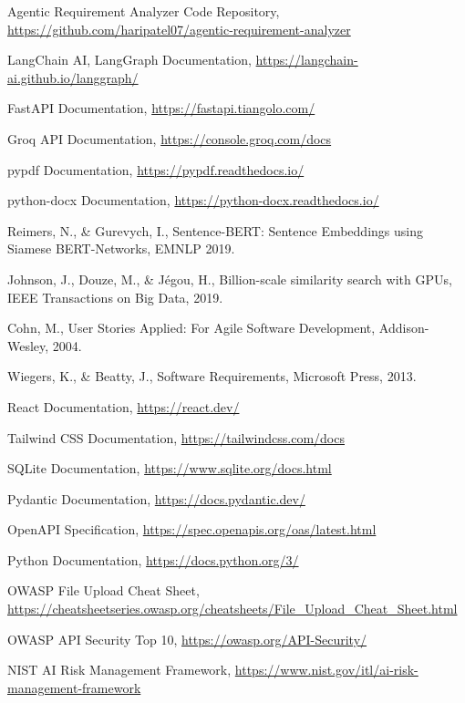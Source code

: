 \documentclass[12pt,a4paper,openany]{report}
\begin{document}
\begin{enumerate}[leftmargin=*,label={[\arabic*]}]
\item Agentic Requirement Analyzer Code Repository,\\ \url{https://github.com/haripatel07/agentic-requirement-analyzer}
\item LangChain AI, LangGraph Documentation, \url{https://langchain-ai.github.io/langgraph/}
\item FastAPI Documentation, \url{https://fastapi.tiangolo.com/}
\item Groq API Documentation, \url{https://console.groq.com/docs}
\item pypdf Documentation, \url{https://pypdf.readthedocs.io/}
\item python-docx Documentation, \url{https://python-docx.readthedocs.io/}
\item Reimers, N., \& Gurevych, I., Sentence-BERT: Sentence Embeddings using Siamese BERT-Networks, EMNLP 2019.
\item Johnson, J., Douze, M., \& J\'egou, H., Billion-scale similarity search with GPUs, IEEE Transactions on Big Data, 2019.
\item Cohn, M., User Stories Applied: For Agile Software Development, Addison-Wesley, 2004.
\item Wiegers, K., \& Beatty, J., Software Requirements, Microsoft Press, 2013.
\item React Documentation, \url{https://react.dev/}
\item Tailwind CSS Documentation, \url{https://tailwindcss.com/docs}
\item SQLite Documentation, \url{https://www.sqlite.org/docs.html}
\item Pydantic Documentation, \url{https://docs.pydantic.dev/}
\item OpenAPI Specification, \url{https://spec.openapis.org/oas/latest.html}
\item Python Documentation, \url{https://docs.python.org/3/}
\item OWASP File Upload Cheat Sheet, \url{https://cheatsheetseries.owasp.org/cheatsheets/File_Upload_Cheat_Sheet.html}
\item OWASP API Security Top 10, \url{https://owasp.org/API-Security/}
\item NIST AI Risk Management Framework, \url{https://www.nist.gov/itl/ai-risk-management-framework}
\end{enumerate}
\end{document}
